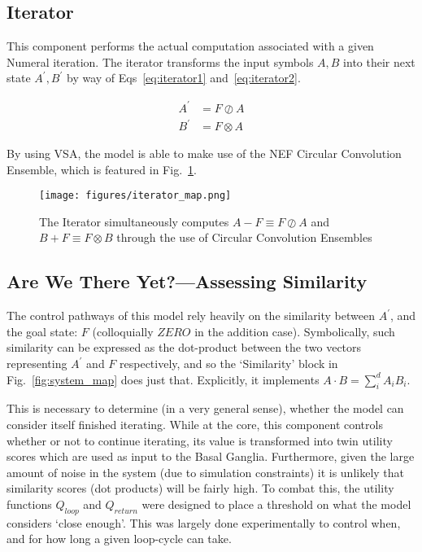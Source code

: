 \documentclass{report}
\begin{document}
\subsection{Iterator}
This component performs the actual computation associated with a given Numeral iteration.
The iterator transforms the input symbols $A, B$ into their next state $A^\prime, B^\prime$ by way of Eqs~\eqref{eq:iterator1} and~\eqref{eq:iterator2}.

\begin{align}\label{eq:iterator1}
	A^\prime &= F \oslash A\\
	B^\prime &= F \otimes A
	\label{eq:iterator2}
\end{align}

By using VSA, the model is able to make use of the NEF Circular Convolution Ensemble, which is featured in Fig.~\ref{fig:iterator_map}.

\begin{figure}[htd]
\centering
\texttt{[image: figures/iterator\_map.png]}
\caption{The Iterator simultaneously computes $A - F \equiv F\oslash A$ and $B + F \equiv F \otimes B$ through the use of Circular Convolution Ensembles}
\label{fig:iterator_map}
\end{figure}

\subsection{Are We There Yet?---Assessing Similarity}
The control pathways of this model rely heavily on the similarity between $A^\prime$, and the goal state: $F$  (colloquially $ZERO$ in the addition case). 
Symbolically, such similarity can be expressed as the dot-product between the two vectors representing $A^\prime$ and $F$ respectively, and so the \lq{}Similarity\rq{} block in Fig.~\ref{fig:system_map} does just that.
Explicitly, it implements $A \cdot B = \sum^d_i  A_i B_i$.

This is necessary to determine (in a very general sense), whether the model can consider itself finished iterating.
While at the core, this component controls whether or not to continue iterating, its value is transformed into twin utility scores which are used as input to the Basal Ganglia.
Furthermore, given the large amount of noise in the system (due to simulation constraints) it is unlikely that similarity scores (dot products) will be fairly high.
To combat this, the utility functions $Q_{loop}$ and $Q_{return}$ were designed to place a threshold on what the model considers \lq{}close enough\rq{}.
This was largely done experimentally to control when, and for how long a given loop-cycle can take.
\end{document}

